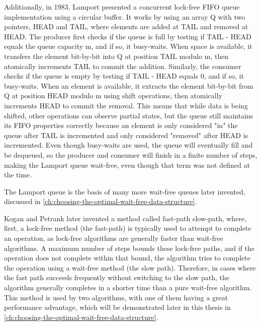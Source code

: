 Additionally, in 1983, Lamport presented a concurrent lock-free \ac{FIFO} queue implementation using a circular buffer. It works by using an array Q with two pointers, HEAD and TAIL, where elements are added at TAIL and removed at HEAD. The producer first checks if the queue is full by testing if TAIL - HEAD equals the queue capacity m, and if so, it busy-waits. When space is available, it transfers the element bit-by-bit into Q at position TAIL modulo m, then atomically increments TAIL to commit the addition. Similarly, the consumer checks if the queue is empty by testing if TAIL - HEAD equals 0, and if so, it busy-waits. When an element is available, it extracts the element bit-by-bit from Q at position HEAD modulo m using shift operations, then atomically increments HEAD to commit the removal. This means that while data is being shifted, other operations can observe partial states, but the queue still maintains its \ac{FIFO} properties correctly because an element is only considered "in" the queue after TAIL is incremented and only considered "removed" after HEAD is incremented. Even though busy-waits are used, the queue will eventually fill and be dequeued, so the producer and consumer will finish in a finite number of steps, making the Lamport queue wait-free, even though that term was not defined at the time. \cite{Lamport1983SPSCCircularBuffer} 

The Lamport queue is the basis of many more wait-free queues later invented, discussed in \cref{ch:choosing-the-optimal-wait-free-data-structure}.

Kogan and Petrank later invented a method called fast-path slow-path, where, first, a lock-free method (the fast-path) is typically used to attempt to complete an operation, as lock-free algorithms are generally faster than wait-free algorithms. A maximum number of steps bounds these lock-free paths, and if the operation does not complete within that bound, the algorithm tries to complete the operation using a wait-free method (the slow path). Therefore, in cases where the fast path succeeds frequently without switching to the slow path, the algorithm generally completes in a shorter time than a pure wait-free algorithm. This method is used by two algorithms, with one of them having a great performance advantage, which will be demonstrated later in this thesis in \cref{ch:choosing-the-optimal-wait-free-data-structure}. \cite{kogan2012methodology}
